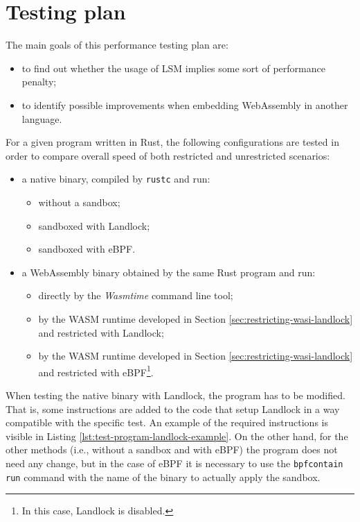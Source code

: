 \section{Testing plan}

The main goals of this performance testing plan are:
\begin{itemize}
  \item to find out whether the usage of LSM implies some sort of performance penalty;
  \item to identify possible improvements when embedding WebAssembly in another language.
\end{itemize}

\noindent
For a given program written in Rust, the following configurations are tested in order to compare
overall speed of both restricted and unrestricted scenarios:
\begin{itemize}
  \item a native binary, compiled by \texttt{rustc} and run:
        \begin{itemize}
          \item without a sandbox;
          \item sandboxed with Landlock;
          \item sandboxed with eBPF.
        \end{itemize}
  \item a WebAssembly binary obtained by the same Rust program and run:
        \begin{itemize}
          \item directly by the \textit{Wasmtime} command line tool;
          \item by the WASM runtime developed in Section \ref{sec:restricting-wasi-landlock} and restricted with Landlock;
          \item by the WASM runtime developed in Section \ref{sec:restricting-wasi-landlock} and restricted with
                eBPF\footnote{In this case, Landlock is disabled.}.
        \end{itemize}
\end{itemize}

When testing the native binary with Landlock, the program has to be modified. That is,
some instructions are added to the code that setup Landlock in a way compatible with the
specific test. An example of the required instructions is visible in Listing \ref{lst:test-program-landlock-example}.
On the other hand, for the other methods (i.e., without a sandbox and with eBPF) the program
does not need any change, but in the case of eBPF it is necessary to use the \texttt{bpfcontain run}
command with the name of the binary to actually apply the sandbox.

